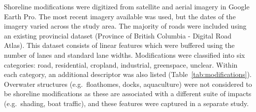 \documentclass[12pt]{article}\usepackage[]{graphicx}\usepackage[]{color}
\begin{document}
Shoreline modifications were digitized from satellite and aerial imagery in Google Earth Pro. The most recent imagery available was used, but the dates of the imagery varied across the study area. The majority of roads were included using an existing provincial dataset (Province of British Columbia - Digital Road Atlas). This dataset consists of linear features which were buffered using the number of lanes and standard lane widths. Modifications were classified into six categories: road, residential, cropland, industrial, greenspace, unclear. Within each category, an additional descriptor was also listed (Table~\ref{tab:modifications}). Overwater structures (e.g.~floathomes, docks, aquaculture) were not considered to be shoreline modifications as these are associated with a different suite of impacts (e.g.~shading, boat traffic), and these features were captured in a separate study.
\end{document}
